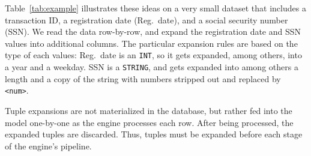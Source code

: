 Table~\ref{tab:example} illustrates these ideas on a very small dataset that includes a transaction ID, a registration date (Reg.\ date), and a social security number (SSN). We read the data row-by-row, and expand the registration date and SSN values into additional columns. The particular expansion rules are based on the type of each values: Reg.\ date is an \texttt{INT}, so it gets expanded, among others, into a year and a weekday. SSN is a \texttt{STRING}, and gets expanded into among others a length and a copy of the string with numbers stripped out and replaced by \texttt{<num>}.

Tuple expansions are not materialized in the database, but rather fed into the model one-by-one as the engine processes each row.
After being processed, the expanded tuples are discarded.
Thus, tuples must be expanded before each stage of the engine's pipeline.

\newcommand*{\boldtt}[1]{\fontfamily{pcr}\selectfont #1}

